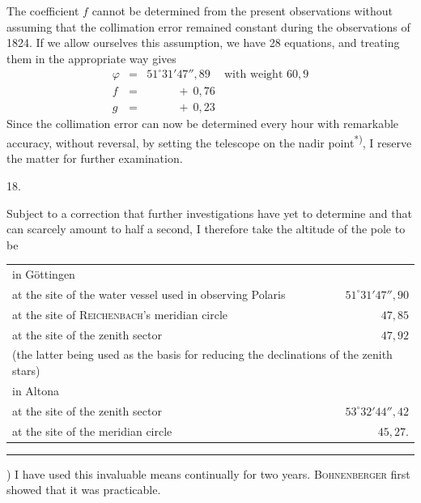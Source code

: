 The coefficient $f$ cannot be determined from the present observations without assuming that the collimation error remained constant during the observations of 1824. If we allow ourselves this assumption, we have 28 equations, and treating them in the appropriate way gives
\[
\begin{array}{rcll}
\varphi&=&51^\circ31'47''{,}89&\text{with weight }60{,}9\\
f&=&\phantom{51^\circ31'}+\ 0{,}76&\\
g&=&\phantom{51^\circ31'}+\ 0{,}23&
\end{array}
\]
Since the collimation error can now be determined every hour with remarkable accuracy, without reversal, by setting the telescope on the nadir point\textsuperscript{*)}, I reserve the matter for further examination.
\begin{center}18.\end{center}
Subject to a correction that further investigations have yet to determine and that can scarcely amount to half a second, I therefore take the altitude of the pole to be
\begin{center}
\begin{tabular}{p{}r}
in Göttingen&\\
\quad at the site of the water vessel used in observing Polaris&$51^\circ31'47''{,}90$\\
\quad at the site of \textsc{Reichenbach}'s meridian circle&$47{,}85$\\
\quad at the site of the zenith sector&$47{,}92$\\
\multicolumn{2}{p{.94\textwidth}}{\quad\quad (the latter being used as the basis for reducing the declinations of the zenith stars)}\\
in Altona&\\
\quad at the site of the zenith sector&$53^\circ32'44''{,}42$\\
\quad at the site of the meridian circle&$45{,}27$.
\end{tabular}
\end{center}
\par\noindent\rule{.25\textwidth}{.4pt}\par
{\footnotesize *) I have used this invaluable means continually for two years. \textsc{Bohnenberger} first showed that it was practicable.\par}

